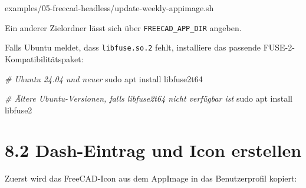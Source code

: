 \documentclass[
  12pt
]{book}
\newenvironment{Shaded}{}{}
\newcommand{\AttributeTok}[1]{\textcolor[rgb]{0.49,0.56,0.16}{#1}}
\newcommand{\BuiltInTok}[1]{\textcolor[rgb]{0.00,0.50,0.00}{#1}}
\newcommand{\CommentTok}[1]{\textcolor[rgb]{0.38,0.63,0.69}{\textit{#1}}}
\newcommand{\ExtensionTok}[1]{#1}
\newcommand{\FunctionTok}[1]{\textcolor[rgb]{0.02,0.16,0.49}{#1}}
\newcommand{\KeywordTok}[1]{\textcolor[rgb]{0.00,0.44,0.13}{\textbf{#1}}}
\newcommand{\NormalTok}[1]{#1}
\newcommand{\OperatorTok}[1]{\textcolor[rgb]{0.40,0.40,0.40}{#1}}
\newcommand{\StringTok}[1]{\textcolor[rgb]{0.25,0.44,0.63}{#1}}
\newcommand{\VariableTok}[1]{\textcolor[rgb]{0.10,0.09,0.49}{#1}}
\begin{document}
\begin{Shaded}
\begin{Highlighting}[]
\ExtensionTok{examples/05{-}freecad{-}headless/update{-}weekly{-}appimage.sh}
\end{Highlighting}
\end{Shaded}

Ein anderer Zielordner lässt sich über \texttt{FREECAD\_APP\_DIR}
angeben.

Falls Ubuntu meldet, dass \texttt{libfuse.so.2} fehlt, installiere das
passende FUSE-2-Kompatibilitätspaket:

\begin{Shaded}
\begin{Highlighting}[]
\CommentTok{\# Ubuntu 24.04 und neuer}
\FunctionTok{sudo}\NormalTok{ apt install libfuse2t64}

\CommentTok{\# Ältere Ubuntu{-}Versionen, falls libfuse2t64 nicht verfügbar ist}
\FunctionTok{sudo}\NormalTok{ apt install libfuse2}
\end{Highlighting}
\end{Shaded}

\hypertarget{dash-eintrag-und-icon-erstellen}{%
\section{\texorpdfstring{{8.2} Dash-Eintrag und Icon
erstellen}{8.2 Dash-Eintrag und Icon erstellen}}\label{dash-eintrag-und-icon-erstellen}}

Zuerst wird das FreeCAD-Icon aus dem AppImage in das Benutzerprofil
kopiert:

\begin{Shaded}
\end{Shaded}
\end{document}
